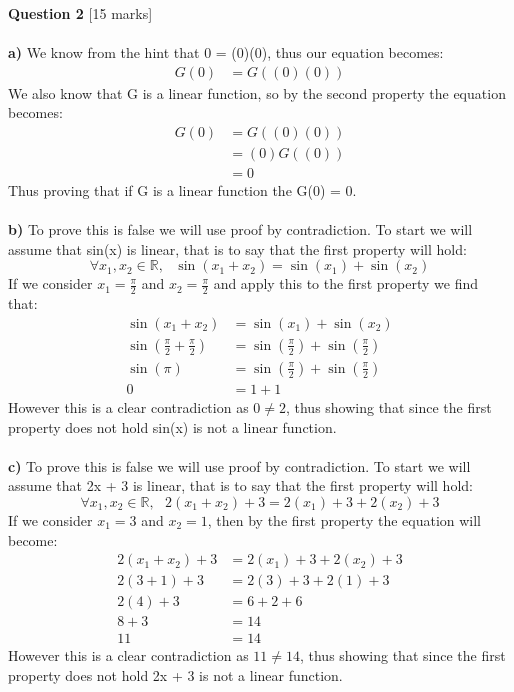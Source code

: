 \documentclass[11pt]{article}
\begin{document}
\textbf{Question 2} [15 marks] \\\\
\textbf{a)} We know from the hint that 0 = (0)(0), thus our equation becomes:
\begin{align*}
G(0) &= G((0)(0))
\end{align*}
We also know that G is a linear function, so by the second property the equation becomes:
\begin{align*}
G(0) &= G((0)(0))\\
       &= (0)G((0))\\
       &= 0
\end{align*}
Thus proving that if G is a linear function the G(0) = 0.\\\\
\textbf{b)} To prove this is false we will use proof by contradiction. To start we will assume that sin(x) is linear, that is to say that the first property will hold:
\[ \forall x_{1}, x_{2} \in \mathbb{R},\text{ } \sin(x_1 + x_2) = \sin(x_1) + \sin(x_2) \]
If we consider $x_{1} = \frac{\pi}{2}$ and $x_{2} = \frac{\pi}{2}$ and apply this to the first property we find that:
\begin{align*}
\sin(x_1 + x_2) &= \sin(x_1) + \sin(x_2)\\
\sin(\frac{\pi}{2} + \frac{\pi}{2}) &= \sin(\frac{\pi}{2}) + \sin(\frac{\pi}{2})\\
 \sin(\pi) &= \sin(\frac{\pi}{2}) + \sin(\frac{\pi}{2}) \\
0 &= 1 + 1
\end{align*}
However this is a clear contradiction as $0 \neq 2$, thus showing that since the first property does not hold sin(x) is not a linear function.\\\\
\textbf{c)} To prove this is false we will use proof by contradiction. To start we will assume that 2x + 3 is linear, that is to say that the first property will hold:
\[ \forall x_{1}, x_{2} \in \mathbb{R},\text{ } 2(x_1 + x_2) + 3 = 2(x_1) + 3 + 2(x_2)+3 \]
If we consider $x_{1} = 3$ and $x_{2} = 1$, then by the first property the equation will become:
\begin{align*}
2(x_1 + x_2) + 3 &= 2(x_1) + 3 + 2(x_2) + 3\\
2(3 + 1) + 3 &= 2(3) + 3 + 2(1) + 3\\
2(4) + 3 &= 6 +  2 + 6\\
8 + 3 &= 14\\
11 &= 14
\end{align*}
However this is a clear contradiction as $11 \neq 14$, thus showing that since the first property does not hold 2x + 3 is not a linear function.\\\\
\end{document}
